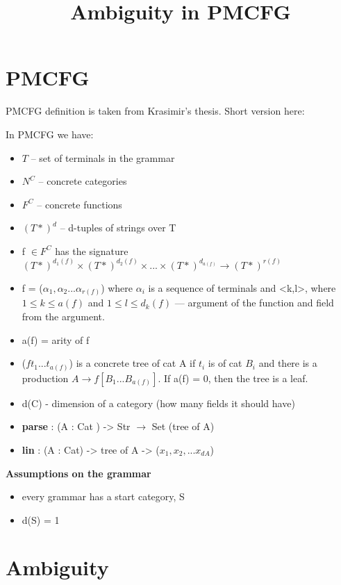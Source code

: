 \documentclass[]{article}
\begin{document}
\title{Ambiguity in PMCFG}

\maketitle 

\section{PMCFG}

PMCFG definition is taken from Krasimir's thesis.  Short version here:

In PMCFG we have:
\begin{itemize}
\item $T$ -- set of terminals in the grammar
\item $N^C$ -- concrete categories
\item $F^C$ -- concrete functions
\item $(T*)^d$ -- d-tuples of strings over T 
\item f $\in F^C$ has the signature $(T*)^{d_1(f)} \times
  (T*)^{d_2(f)} \times ... \times (T*)^{d_{a(f)}} \to (T*)^{r(f)}$
\item f = ($\alpha_1, \alpha_2 ... \alpha_{r(f)}$) where $\alpha_i$ is
  a sequence of terminals and <k,l>, where $1 \leq k \leq a(f)$ and $1
  \leq l \leq d_k(f)$ --- argument of the function and field from the argument.  
\item a(f) = arity of f
\item ($f t_1 ... t_{a(f)}$) is a concrete tree of cat A if $t_i$ is
  of cat $B_i$ and there is a production $A \to f [B_1
  ... B_{a(f)}]$. If a(f) = 0, then the tree is a leaf. 
\item d(C) - dimension of a category (how many fields it should have)
\item \textbf{parse} : (A : Cat ) -> Str $\to$ Set (tree of A)
\item \textbf{lin} : (A : Cat) -> tree of A -> ($x_1, x_2, ... x_{d{A}}$)
\end{itemize}


\textbf{Assumptions on the grammar}
\begin{itemize}
\item every grammar has a start category, S
\item d(S) = 1
\end{itemize}

\section{Ambiguity}
\end{document}
